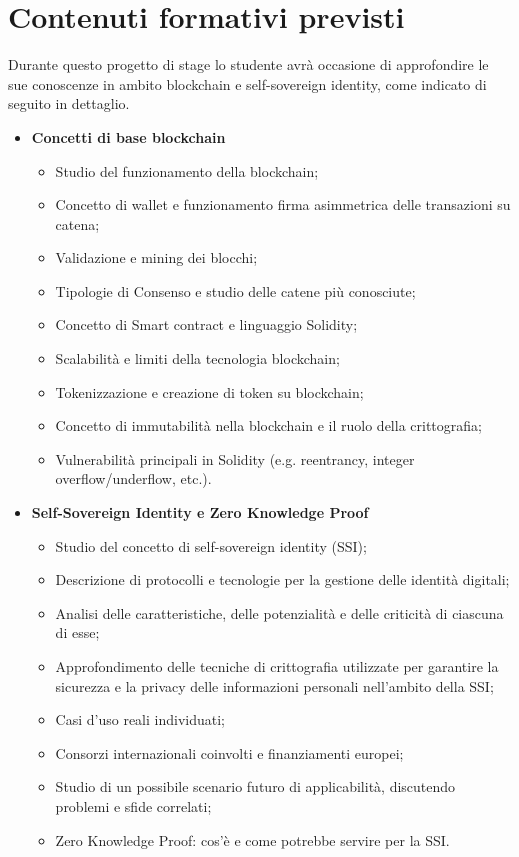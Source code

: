 \section*{Contenuti formativi previsti}
Durante questo progetto di stage lo studente avrà occasione di approfondire le sue conoscenze in ambito blockchain e self-sovereign identity,
come indicato di seguito in dettaglio.
\begin{itemize}
    \item \textbf{Concetti di base blockchain}
    \begin{itemize}
        \item Studio del funzionamento della blockchain;
        \item Concetto di wallet e funzionamento firma asimmetrica delle transazioni su catena;
        \item Validazione e mining dei blocchi;
        \item Tipologie di Consenso e studio delle catene più conosciute;
        \item Concetto di Smart contract e linguaggio Solidity;
        \item Scalabilità e limiti della tecnologia blockchain;
        \item Tokenizzazione e creazione di token su blockchain;
        \item Concetto di immutabilità nella blockchain e il ruolo della crittografia;
        \newpage
        \item Vulnerabilità principali in Solidity (e.g. reentrancy, integer overflow/underflow, etc.).
    \end{itemize}
    \item \textbf{Self-Sovereign Identity e Zero Knowledge Proof}
    \begin{itemize}
        \item Studio del concetto di self-sovereign identity (SSI);
        \item Descrizione di protocolli e tecnologie per la gestione delle identità digitali;
        \item Analisi delle caratteristiche, delle potenzialità e delle criticità di ciascuna di esse;
        \item Approfondimento delle tecniche di crittografia utilizzate per garantire la sicurezza e la privacy delle informazioni personali nell'ambito della SSI;
        \item Casi d'uso reali individuati;
        \item Consorzi internazionali coinvolti e finanziamenti europei;
        \item Studio di un possibile scenario futuro di applicabilità, discutendo problemi e sfide correlati;
        \item Zero Knowledge Proof: cos'è e come potrebbe servire per la SSI.
    \end{itemize}
\end{itemize}


